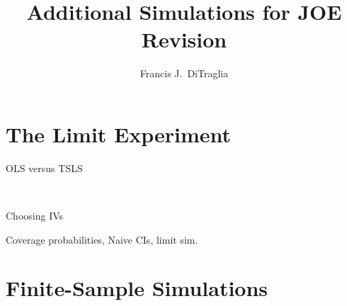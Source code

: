 \documentclass[12pt,letterpaper]{article}
\title{Additional Simulations for JOE Revision}
\author{Francis J.\ DiTraglia}
\begin{document}
\maketitle

\section{The Limit Experiment}

\begin{table}[h]
  \centering
  \begin{subtable}{0.48\textwidth}
    \caption{OLS versus TSLS}
    
  \end{subtable}
  ~
  \begin{subtable}{0.48\textwidth}
    \caption{Choosing IVs}
    
  \end{subtable}
  \label{tab:LimitNaive}
  \caption{Coverage probabilities, Naive CIs, limit sim.}
\end{table}

\section{Finite-Sample Simulations}
\end{document}
